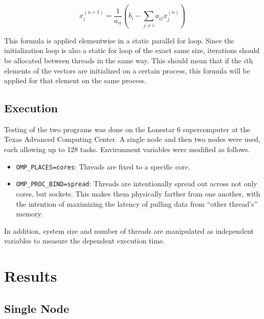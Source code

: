 \documentclass{article}
\begin{document}
\begin{equation}
	x_{i}^{(n + 1)} = \frac{1}{a_{ii}} \left( b_{i} - \sum_{j \neq i} a_{ij} x_{j}^{(n)} \right)
\end{equation}

This formula is applied elementwise in a static parallel for loop. Since the initialization loop is also a static for loop of the exact same size, iterations should be allocated between threads in the same way. This should mean that if the $i$th elements of the vectors are initialized on a certain process, this formula will be applied for that element on the same process.

\subsection{Execution}

Testing of the two programs was done on the Lonestar 6 supercomputer at the Texas Advanced Computing Center. A single node and then two nodes were used, each allowing up to 128 tasks. Environment variables were modified as follows.

\begin{itemize}
	\item \verb|OMP_PLACES=cores|: Threads are fixed to a specific core.
	\item \verb|OMP_PROC_BIND=spread|: Threads are intentionally spread out across not only cores, but sockets. This makes them physically farther from one another, with the intention of maximizing the latency of pulling data from ``other thread's'' memory.
\end{itemize}

In addition, system size and number of threads are manipulated as independent variables to measure the dependent execution time.

\section{Results}

\subsection{Single Node}
\end{document}
